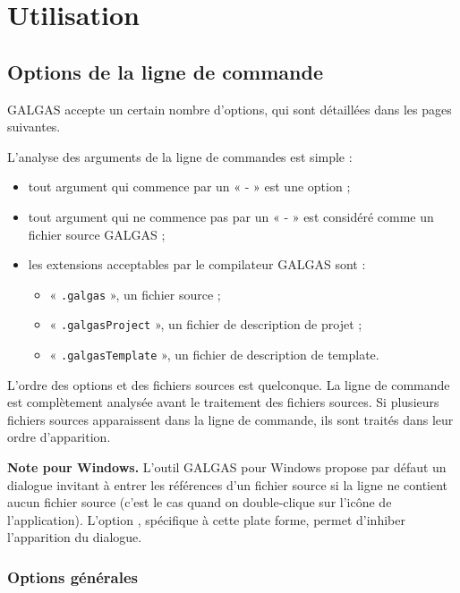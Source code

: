 
\chapter{Utilisation}


\section{Options de la ligne de commande}

GALGAS accepte un certain nombre d’options, qui sont détaillées dans les pages suivantes.

L’analyse des arguments de la ligne de commandes est simple :
\begin{itemize}
  \item tout argument qui commence par un « - » est une option ;
  \item tout argument qui ne commence pas par un « - » est considéré comme un fichier source GALGAS ;
  \item les extensions acceptables par le compilateur GALGAS sont :
  \begin{itemize}
    \item « \texttt{.galgas} », un fichier source ;
    \item « \texttt{.galgasProject} », un fichier de description de projet ;
    \item « \texttt{.galgasTemplate} », un fichier de description de template.
  \end{itemize}
\end{itemize}

L’ordre des options et des fichiers sources est quelconque. La ligne de commande est complètement analysée avant le traitement des fichiers sources. Si plusieurs fichiers sources apparaissent dans la ligne de commande, ils sont traités dans leur ordre d’apparition.

{\bf Note pour Windows.} L’outil GALGAS pour Windows propose par défaut un dialogue invitant à entrer les références d’un fichier source si la ligne ne contient aucun fichier source (c’est le cas quand on double-clique sur l’icône de l’application). L'option , spécifique à cette plate forme, permet d'inhiber l’apparition du dialogue.

\subsection{Options générales}

